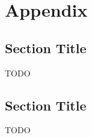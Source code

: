 \chapter*{Appendix}

\setcounter{section}{0}
\renewcommand{\thesection}{\Alph{section}}

\renewcommand{\thefigure}{\thesection.\arabic{figure}}
\renewcommand{\thetable}{\thesection.\arabic{table}}

\section{Section Title}
TODO



\section{Section Title}
TODO